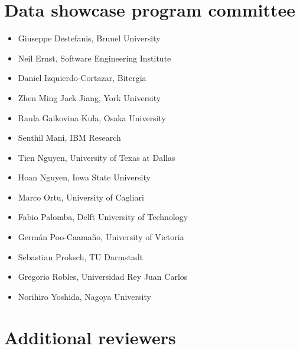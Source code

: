 \documentclass[a4paper]{report}
\begin{document}
\section{Data showcase program committee}

\begin{itemize}
\item Giuseppe Destefanis, Brunel University
\item Neil Ernst, Software Engineering Institute
\item Daniel Izquierdo-Cortazar, Bitergia
\item Zhen Ming Jack Jiang, York University
\item Raula Gaikovina Kula, Osaka University
\item Senthil Mani, IBM Research
\item Tien Nguyen, University of Texas at Dallas
\item Hoan Nguyen, Iowa State University
\item Marco Ortu, University of Cagliari
\item Fabio Palomba, Delft University of Technology
\item Germán Poo-Caamaño, University of Victoria
\item Sebastian Proksch, TU Darmstadt
\item Gregorio Robles, Universidad Rey Juan Carlos
\item Norihiro Yoshida, Nagoya University
\end{itemize}

\section{Additional reviewers}
\end{document}
